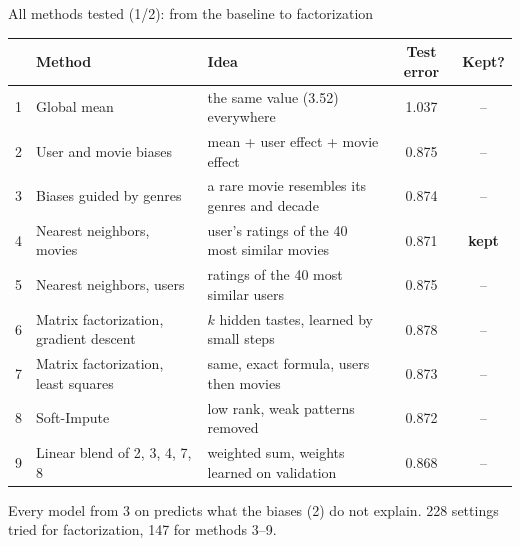 \documentclass[aspectratio=169,11pt]{beamer}
\newcommand{\key}[1]{\textcolor{accent}{\textbf{#1}}}
\newcommand{\muted}[1]{\textcolor{soft}{#1}}
\newcommand{\kept}{\key{kept}}
\newcommand{\no}{\muted{--}}
\begin{document}
\begin{frame}{All methods tested (1/2): from the baseline to factorization}
\footnotesize\setlength{\tabcolsep}{3pt}\hspace*{-0.45cm}%
\begin{tabular}{@{}rllcc@{}}
\toprule
 & \textbf{Method} & \textbf{Idea} & \textbf{Test error} & \textbf{Kept?} \\
\midrule
1 & Global mean & the same value (3.52) everywhere & 1.037 & \no \\
2 & User and movie biases & mean + user effect + movie effect & 0.875 & \no \\
3 & Biases guided by genres & a rare movie resembles its genres and decade & 0.874 & \no \\
4 & Nearest neighbors, movies & user's ratings of the 40 most similar movies & 0.871 & \kept \\
5 & Nearest neighbors, users & ratings of the 40 most similar users & 0.875 & \no \\
6 & Matrix factorization, gradient descent & $k$ hidden tastes, learned by small steps & 0.878 & \no \\
7 & Matrix factorization, least squares & same, exact formula, users then movies & 0.873 & \no \\
8 & Soft-Impute & low rank, weak patterns removed & 0.872 & \no \\
9 & Linear blend of 2, 3, 4, 7, 8 & weighted sum, weights learned on validation & 0.868 & \no \\
\bottomrule
\end{tabular}

\vspace{0.5em}
\muted{\footnotesize Every model from 3 on predicts what the biases (2) do not explain. 228 settings
tried for factorization, 147 for methods 3--9.}
\end{frame}
\end{document}
